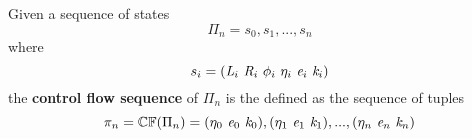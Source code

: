 \begin{definition}
Given a sequence of states $$\Pi_n = s_0,s_1,...,s_n$$ where $$s_i = (\cfgnt{L}_i\ \cfgnt{R}_i\ \phi_i\ \eta_i\ \cfgnt{e}_i\ \cfgnt{k}_i )$$ the \textbf{control flow sequence} of $\Pi_n$ is the defined as the sequence of tuples $$ \pi_n = \mathbb{CF}(\Pi_n) = (\eta_0\ \cfgnt{e}_0\ \cfgnt{k}_0),(\eta_1\ \cfgnt{e}_1\ \cfgnt{k}_1),...,(\eta_n\ \cfgnt{e}_n\ \cfgnt{k}_n)$$
\end{definition}

%
%
%

